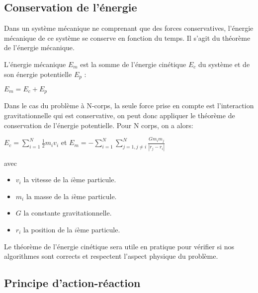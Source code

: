 \subsection{Conservation de l'énergie}

Dans un système mécanique ne comprenant que des forces conservatives, l'énergie mécanique de ce système se conserve en fonction du temps. Il s'agit du théorème de l'énergie mécanique.

L'énergie mécanique $E_m$ est la somme de l'énergie cinétique $E_c$ du système et de son énergie potentielle $E_p$ :

\begin{center}
$E_m = E_c + E_p$
\end{center}

Dans le cas du problème à N-corps, la seule force prise en compte est l'interaction gravitationnelle qui est conservative, on peut donc appliquer le théorème de conservation de l'énergie potentielle. Pour N corps, on a alors:

\begin{center}
$E_c = \sum\limits_{i=1}^{N} \frac{1}{2}m_iv_i$  et $E_m =- \sum\limits_{i=1}^{N} \sum\limits_{j=1,j \ne i}^{N} \frac{G m_i m_j}{| r_j - r_i |}$
\end{center}

avec 
\begin{itemize}
\item $v_i$ la vitesse de la $i$ème particule.

\item $m_i$ la masse de la $i$ème particule.

\item $G$ la constante gravitationnelle.

\item $r_i$ la position de la $i$ème particule.

\end{itemize}

\vspace{1mm}
Le théorème de l'énergie cinétique sera utile en pratique pour vérifier si nos algorithmes sont corrects et respectent l'aspect physique du problème.

\vspace{2mm}
\subsection{Principe d'action-réaction}
\vspace{2mm}

